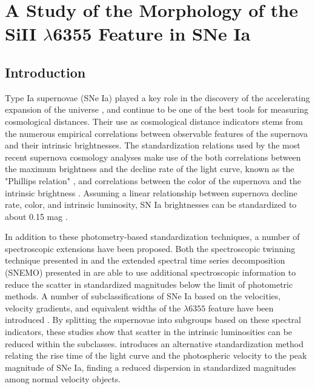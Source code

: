 \chapter{A Study of the Morphology of the SiII \texorpdfstring{$\lambda$}{}6355 Feature in SNe Ia}
\label{chap:si_feat_pca}

\section{Introduction}
\label{intro}
Type Ia supernovae (SNe Ia) played a key role in the discovery of the accelerating expansion of the universe \citep{perlmutter_measurements_1999, riess_observational_1998}, and continue to be one of the best tools for measuring cosmological distances. Their use as cosmological distance indicators stems from the numerous empirical correlations between observable features of the supernova and their intrinsic brightnesses. The standardization relations used by the most recent supernova cosmology analyses make use of the both correlations between the maximum brightness and the decline rate of the light curve, known as the "Phillips relation" \citep{phillips_absolute_1993}, and correlations between the color of the supernova and the intrinsic brightness \citep{riess_precise_1996, tripp_two-parameter_1998, guy_salt_2005, guy_salt2_2007}. Assuming a linear relationship between supernova decline rate, color, and intrinsic luminosity, SN Ia brightnesses can be standardized to about 0.15 mag \citep{betoule_improved_2014}.

In addition to these photometry-based standardization techniques, a number of spectroscopic extensions have been proposed. Both the spectroscopic twinning technique presented in \cite{fakhouri_improving_2015} and the extended spectral time series decomposition (SNEMO) presented in \cite{saunders_snemo_2018} are able to use additional spectroscopic information to reduce the scatter in standardized magnitudes below the limit of photometric methods. A number of subclassifications of SNe Ia based on the velocities, velocity gradients, and equivalent widths of the  $\lambda6355$ feature have been introduced \citep{branch_comparative_2006, benetti_diversity_2005, wang_improved_2009, wang_evidence_2013}. By splitting the supernovae into subgroups based on these spectral indicators, these studies show that scatter in the intrinsic luminosities can be reduced within the subclasses. \cite{zheng_empirical_2018} introduces an alternative standardization method relating the rise time of the light curve and the photospheric velocity to the peak magnitude of SNe Ia, finding a reduced dispersion in standardized magnitudes among normal velocity objects.

